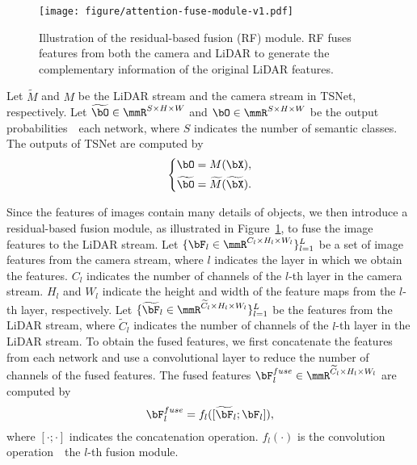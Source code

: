 \documentclass[10pt,twocolumn,letterpaper]{article}
\begin{document}
\begin{figure}[t]
    \centering
    \texttt{[image: figure/attention-fuse-module-v1.pdf]}
    \caption{Illustration of the residual-based fusion (RF) module. RF fuses  features from both the camera and LiDAR to generate the complementary information of the original LiDAR features.}
    \label{fig:fusion_module}
\end{figure}

Let $\widetilde{M}$ and $M$ be the LiDAR stream and the camera stream in TSNet, respectively. Let $\widetilde{\bO}\in \mmR^{S\times H \times W}$ and $\bO \in \mmR^{S\times H \times W}$ be the output probabilities~\wrt~each network, where $S$ indicates the number of semantic classes. The outputs of TSNet are computed by
\begin{equation}
\label{eq:output_tsnet}
    \left\{
    \begin{aligned}
        & \bO  = M(\bX), \\
        & \widetilde{\bO} = \widetilde{M}(\widetilde{\bX}).
    \end{aligned}
    \right.
\end{equation}


Since the features of images contain many details of objects, we then introduce a residual-based fusion module, as illustrated in Figure~\ref{fig:fusion_module}, to fuse the image features to the LiDAR stream. Let $\{\bF_l\in \mmR^{C_l\times H_l \times W_l}\}_{l=1}^L$ be a set of image features from the camera stream, where $l$ indicates the layer in which we obtain the features. $C_l$ indicates the number of channels of the $l$-th layer in the camera stream. $H_l$ and $W_l$ indicate the height and width of the feature maps from the $l$-th layer, respectively. Let $\{\widetilde{\bF}_l\in \mmR^{\widetilde{C}_l\times H_l \times W_l}\}_{l=1}^L$ be the features from the LiDAR stream, where $\widetilde{C}_l$ indicates the number of channels of the $l$-th layer in the LiDAR stream. To obtain the fused features, we first concatenate the features from each network and use a convolutional layer to reduce the number of channels of the fused features. The fused features $\bF_l^{fuse}\in \mmR^{\widetilde{C}_l\times H_l \times W_l}$ are computed by 
\begin{equation}
\label{eq:fuse_cat}
    \bF_l^{fuse}= f_l([\widetilde{\bF}_l; \bF_l]),
\end{equation} 
where $[\cdot;\cdot]$ indicates the concatenation operation. $f_l(\cdot)$ is the convolution operation~\wrt~the $l$-th fusion module. 
\end{document}

